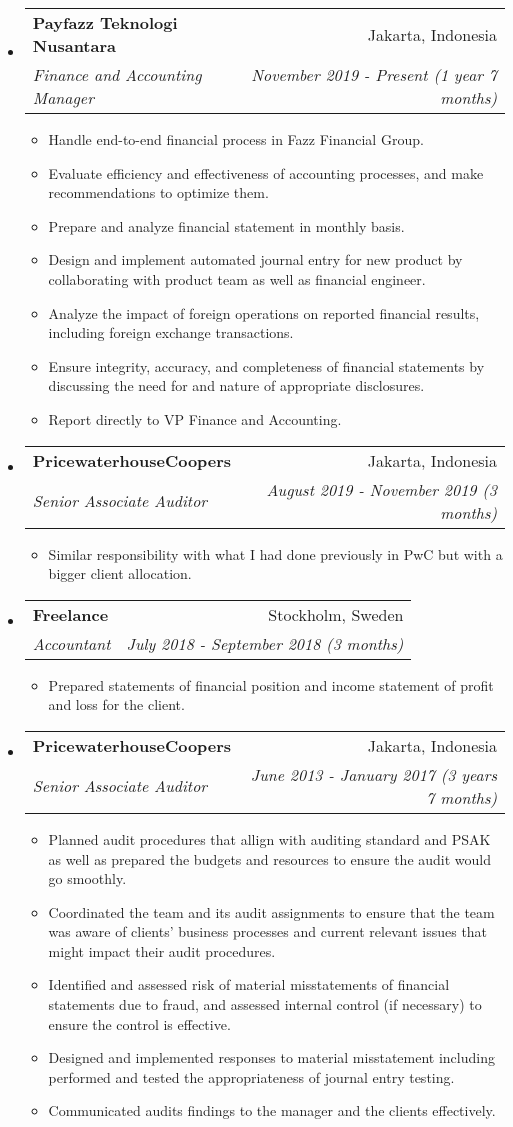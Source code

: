 \documentclass[letterpaper,9pt]{article}
\makeatletter
\newcommand{\resitem}[1]{\item #1 \vspace{-2pt}}
\newcommand{\ressubheading}[4]{
\begin{tabular*}{6.5in}{l@{\cftdotfill{\cftsecdotsep}\extracolsep{\fill}}r}
		\textbf{#1} & #2 \\
		\textit{#3} & \textit{#4} \\
\end{tabular*}\vspace{-6pt}}
\makeatother
\begin{document}
\begin{itemize}

  \item 
  \ressubheading{Payfazz Teknologi Nusantara}{Jakarta, Indonesia}{Finance and Accounting Manager}{November 2019 - Present (1 year 7 months)}
  \begin{itemize}
    \resitem{Handle end-to-end financial process in Fazz Financial Group.}
    \resitem{Evaluate efficiency and effectiveness of accounting processes, and make recommendations to optimize them.}
    \resitem{Prepare and analyze financial statement in monthly basis.}
    \resitem{Design and implement automated journal entry for new product by collaborating with product team as well as financial engineer.}
    \resitem{Analyze the impact of foreign operations on reported financial results, including foreign exchange transactions.}
    \resitem{Ensure integrity, accuracy, and completeness of financial statements by discussing the need for and nature of appropriate disclosures.}
    \resitem{Report directly to VP Finance and Accounting.}
  \end{itemize}

\item 
\ressubheading{PricewaterhouseCoopers}{Jakarta, Indonesia}{Senior Associate Auditor}{August 2019 - November 2019 (3 months)}
\begin{itemize}
  \resitem{Similar responsibility with what I had done previously in PwC but with a bigger client allocation.}
\end{itemize}


\item
\ressubheading{Freelance}{Stockholm, Sweden}{Accountant}{July 2018 - September 2018 (3 months)}
\begin{itemize}
  \resitem{Prepared statements of financial position and income statement of profit and loss for the client.}
\end{itemize}

\item
	\ressubheading{PricewaterhouseCoopers}{Jakarta, Indonesia}{Senior Associate Auditor}{June 2013 - January 2017 (3 years 7 months)}
  \begin{itemize}
    \resitem{Planned audit procedures that allign with auditing standard and PSAK as well as prepared the budgets and resources to ensure the audit would go smoothly.}
    \resitem{Coordinated the team and its audit assignments to ensure that the team was aware of clients' business processes and current relevant issues that might impact their audit procedures.}
    \resitem{Identified and assessed risk of material misstatements of financial statements due to fraud, and assessed internal control (if necessary) to ensure the control is effective.}
    \resitem{Designed and implemented responses to material misstatement including performed and tested the appropriateness of  journal entry testing.}
    \resitem{Communicated audits findings to the manager and the clients effectively.}
	\end{itemize}


\end{itemize}
\end{document}
